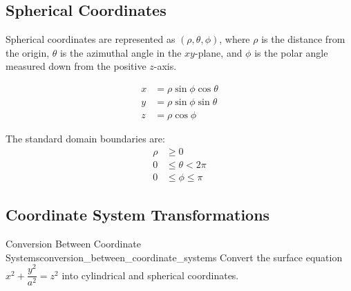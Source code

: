\subsection{Spherical Coordinates}
Spherical coordinates are represented as $(\rho, \theta, \phi)$, where $\rho$ is the distance from the origin, $\theta$ is the azimuthal angle in the $xy$-plane, and $\phi$ is the polar angle measured down from the positive $z$-axis.

\begin{align*}
x &= \rho\sin\phi\cos\theta \\
y &= \rho\sin\phi\sin\theta \\
z &= \rho\cos\phi
\end{align*}

The standard domain boundaries are:
\begin{align*}
\rho &\ge 0 \\
0 &\le \theta < 2\pi \\
0 &\le \phi \le \pi
\end{align*}

\begin{center}
\end{center}

\subsection{Coordinate System Transformations}

\begin{problem}{Conversion Between Coordinate Systems}{conversion_between_coordinate_systems}
Convert the surface equation $x^2 + \dfrac{y^2}{a^2} = z^2$ into cylindrical and spherical coordinates.
\end{problem}

